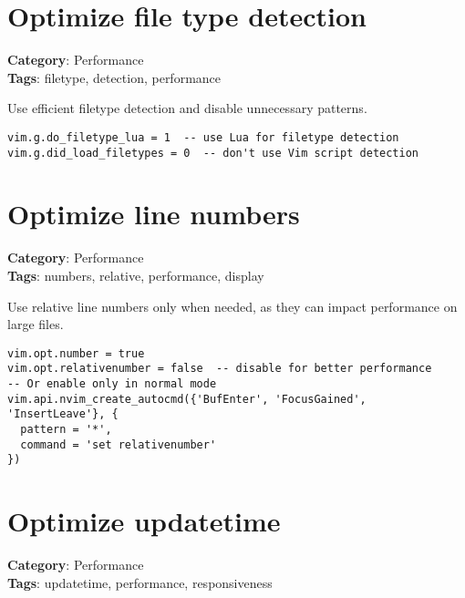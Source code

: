 {{{{{{{{{{\section{Optimize file type detection}

\textbf{Category}: Performance\\ \textbf{Tags}: filetype, detection, performance
\vspace{0.5cm}

Use efficient filetype detection and disable unnecessary patterns.

\begin{Exa*}{}
\begin{Verbatim}[fontsize=\footnotesize, breaklines, breakanywhere]
vim.g.do_filetype_lua = 1  -- use Lua for filetype detection
vim.g.did_load_filetypes = 0  -- don't use Vim script detection
\end{Verbatim}
\end{Exa*}

\section{Optimize line numbers}

\textbf{Category}: Performance\\ \textbf{Tags}: numbers, relative, performance, display
\vspace{0.5cm}

Use relative line numbers only when needed, as they can impact performance on large files.

\begin{Exa*}{}
\begin{Verbatim}[fontsize=\footnotesize, breaklines, breakanywhere]
vim.opt.number = true
vim.opt.relativenumber = false  -- disable for better performance
-- Or enable only in normal mode
vim.api.nvim_create_autocmd({'BufEnter', 'FocusGained', 'InsertLeave'}, {
  pattern = '*',
  command = 'set relativenumber'
})
\end{Verbatim}
\end{Exa*}

\section{Optimize updatetime}

\textbf{Category}: Performance\\ \textbf{Tags}: updatetime, performance, responsiveness
\vspace{0.5cm}

}}}}}}}}}}

